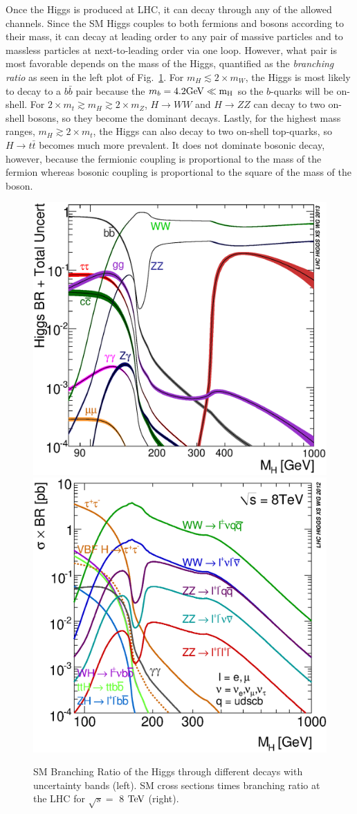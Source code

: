 Once the Higgs is produced at LHC, it can decay through any of the allowed channels. Since the SM Higgs couples to both fermions and bosons according to their mass, it can decay at leading order to any pair of massive particles and to massless particles at next-to-leading order via one loop. However, what pair is most favorable depends on the mass of the Higgs, quantified as the \textit{branching ratio} as seen in the left plot of Fig.~\ref{fig:HXSWGDecay}. For $m_H\lesssim2\times m_W$, the Higgs is most likely to decay to a $b\bar{b}$ pair because the $m_b = 4.2 \rm{GeV} \ll m_H$ so the $b$-quarks will be on-shell. For $2\times m_t \gtrsim m_H \gtrsim 2\times m_Z$, $H\rightarrow WW$ and $H\rightarrow ZZ$ can decay to two on-shell bosons, so they become the dominant decays. Lastly, for the highest mass ranges, $m_H \gtrsim 2\times m_t$, the Higgs can also decay to two on-shell top-quarks, so $H\rightarrow t\bar{t}$ becomes much more prevalent. It does not dominate bosonic decay, however, because the fermionic coupling is proportional to the mass of the fermion whereas bosonic coupling is proportional to the square of the mass of the boson.

\begin{figure}[htbp]
\begin{center}
\includegraphics[width=.45\linewidth]{Phenomenology/figures/Higgs_BR}
\includegraphics[width=.45\linewidth]{Phenomenology/figures/XSBR_8TeV_SM_HM}
\caption[Standard Model Decay Branching Ratios for the Higgs at the LHC as a Function of the Higgs' Mass]{SM Branching Ratio of the Higgs through different decays with uncertainty bands (left). SM cross sections times branching ratio at the LHC for $\sqrt{s}=$ 8 $\rm{TeV}$ (right).~\cite{HXSWG}}
\label{fig:HXSWGDecay}
\end{center}
\end{figure}

